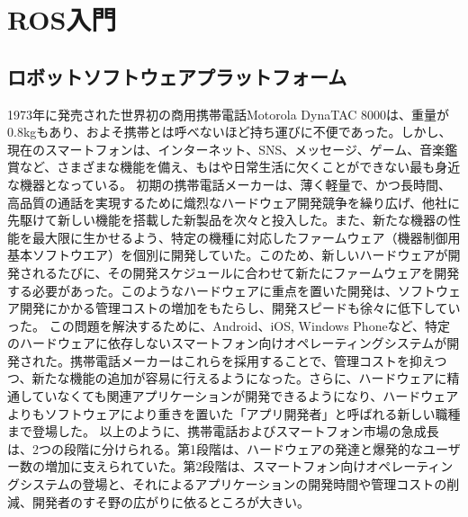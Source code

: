 
\chapter{ROS入門}

\section{ロボットソフトウェアプラットフォーム}

1973年に発売された世界初の商用携帯電話Motorola DynaTAC  8000は、重量が0.8kgもあり、およそ携帯とは呼べないほど持ち運びに不便であった。しかし、現在のスマートフォンは、インターネット、SNS、メッセージ、ゲーム、音楽鑑賞など、さまざまな機能を備え、もはや日常生活に欠くことができない最も身近な機器となっている。
初期の携帯電話メーカーは、薄く軽量で、かつ長時間、高品質の通話を実現するために熾烈なハードウェア開発競争を繰り広げ、他社に先駆けて新しい機能を搭載した新製品を次々と投入した。また、新たな機器の性能を最大限に生かせるよう、特定の機種に対応したファームウェア（機器制御用基本ソフトウエア）を個別に開発していた。このため、新しいハードウェアが開発されるたびに、その開発スケジュールに合わせて新たにファームウェアを開発する必要があった。このようなハードウェアに重点を置いた開発は、ソフトウェア開発にかかる管理コストの増加をもたらし、開発スピードも徐々に低下していった。
この問題を解決するために、Android、iOS, Windows Phoneなど、特定のハードウェアに依存しないスマートフォン向けオペレーティングシステムが開発された。携帯電話メーカーはこれらを採用することで、管理コストを抑えつつ、新たな機能の追加が容易に行えるようになった。さらに、ハードウェアに精通していなくても関連アプリケーションが開発できるようになり、ハードウェアよりもソフトウェアにより重きを置いた「アプリ開発者」と呼ばれる新しい職種まで登場した。
以上のように、携帯電話およびスマートフォン市場の急成長は、2つの段階に分けられる。第1段階は、ハードウェアの発達と爆発的なユーザー数の増加に支えられていた。第2段階は、スマートフォン向けオペレーティングシステムの登場と、それによるアプリケーションの開発時間や管理コストの削減、開発者のすそ野の広がりに依るところが大きい。

